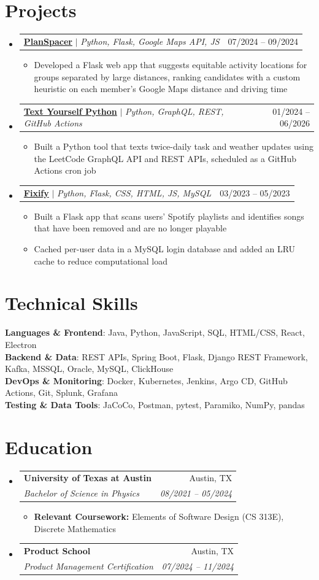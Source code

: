\documentclass[letterpaper]{article}
\makeatletter
\newcommand{\resumeItem}[1]{
  \item\small{
    {#1 \vspace{-2pt}}
  }
}
\newcommand{\resumeSubheading}[4]{
  \vspace{-2pt}\item
    \begin{tabular*}{0.97\textwidth}[t]{l@{\extracolsep{\fill}}r}
      \textbf{#1} & #2 \\
      \textit{\small#3} & \textit{\small #4} \\
    \end{tabular*}\vspace{-7pt}
}
\newcommand{\resumeProjectHeading}[2]{
    \item
    \begin{tabular*}{0.97\textwidth}{l@{\extracolsep{\fill}}r}
      \small#1 & #2 \\
    \end{tabular*}\vspace{-7pt}
}
\newcommand{\resumeSubHeadingListStart}{\begin{itemize}[leftmargin=0.15in, label={}]}
\newcommand{\resumeSubHeadingListEnd}{\end{itemize}}
\newcommand{\resumeItemListStart}{\begin{itemize}}
\newcommand{\resumeItemListEnd}{\end{itemize}\vspace{-5pt}}
\makeatother
\begin{document}
\section{Projects}
\resumeSubHeadingListStart
  \resumeProjectHeading
  {\href{https://github.com/adeshpande03/PlanSpacer}{\textbf{PlanSpacer}} $|$ \emph{Python, Flask, Google Maps API, JS}}{07/2024 -- 09/2024}
  \resumeItemListStart
  \resumeItem{Developed a Flask web app that suggests equitable activity locations for groups separated by large distances, ranking candidates with a custom heuristic on each member's Google Maps distance and driving time}
  \resumeItemListEnd
  \resumeProjectHeading
  {\href{https://github.com/adeshpande03/Text-Yourself-Python}{\textbf{Text Yourself Python}} $|$ \emph{Python, GraphQL, REST, GitHub Actions}}{01/2024 -- 06/2026}
  \resumeItemListStart
  \resumeItem{Built a Python tool that texts twice-daily task and weather updates using the LeetCode GraphQL API and REST APIs, scheduled as a GitHub Actions cron job}
  \resumeItemListEnd
  \resumeProjectHeading
  {\href{https://github.com/adeshpande03/fixify}{\textbf{Fixify}} $|$ \emph{Python, Flask, CSS, HTML, JS, MySQL}}{03/2023 -- 05/2023}
  \resumeItemListStart
  \resumeItem{Built a Flask app that scans users' Spotify playlists and identifies songs that have been removed and are no longer playable}
  \resumeItem{Cached per-user data in a MySQL login database and added an LRU cache to reduce computational load}
  \resumeItemListEnd
\resumeSubHeadingListEnd

\section{Technical Skills}
 \begin{itemize}[leftmargin=0.15in, label={}]
    \small{\item{
     \textbf{Languages \& Frontend}{: Java, Python, JavaScript, SQL, HTML/CSS, React, Electron} \\
     \textbf{Backend \& Data}{: REST APIs, Spring Boot, Flask, Django REST Framework, Kafka, MSSQL, Oracle, MySQL, ClickHouse} \\
     \textbf{DevOps \& Monitoring}{: Docker, Kubernetes, Jenkins, Argo CD, GitHub Actions, Git, Splunk, Grafana} \\
     \textbf{Testing \& Data Tools}{: JaCoCo, Postman, pytest, Paramiko, NumPy, pandas}
     }}
 \end{itemize}

\section{Education}
  \resumeSubHeadingListStart
    \resumeSubheading
      {University of Texas at Austin}{Austin, TX}
      {Bachelor of Science in Physics}{08/2021 -- 05/2024}
      \resumeItemListStart
      \resumeItem{\textbf{Relevant Coursework:} Elements of Software Design (CS 313E), Discrete Mathematics}
      \resumeItemListEnd
    \resumeSubheading
      {Product School}{Austin, TX}
      {Product Management Certification}{07/2024 -- 11/2024}
  \resumeSubHeadingListEnd
\end{document}
